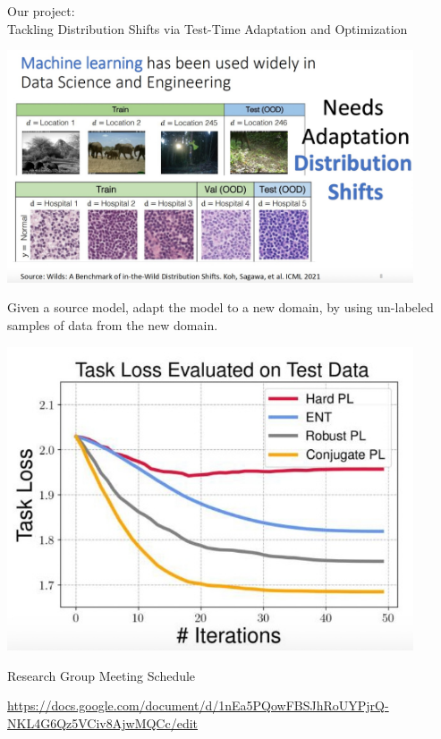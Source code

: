 \documentclass{beamer}
\begin{document}
\begin{frame}{}

\end{frame}

\begin{frame}{}

\end{frame}

\begin{frame}

\begin{block}{}
Our project: \\ Tackling Distribution Shifts via Test-Time Adaptation and Optimization
\end{block}

\end{frame}

\begin{frame}
{
\centering
 \includegraphics[width=12cm]{fig1.jpg}
}


\end{frame}

\begin{frame}[t]
\large 
\begin{exampleblock}{}
Given a source model, adapt the model to a new domain, by using un-labeled samples of data from the new domain.
\end{exampleblock}

\end{frame}

\begin{frame}[t]

{
\centering
 \includegraphics[width=12cm]{fig3.jpg}
}

\end{frame}

\begin{frame}[t]
{}


Research Group Meeting Schedule

\url{https://docs.google.com/document/d/1nEa5PQowFBSJhRoUYPjrQ-NKL4G6Qz5VCiv8AjwMQCc/edit}

\end{frame}
\end{document}
